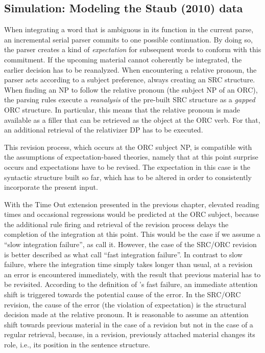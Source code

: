 \documentclass{cambridge7A}\usepackage[]{graphicx}\usepackage[]{color}
\begin{document}
\subsection{Simulation: Modeling the Staub (2010) data}
When integrating a word that is ambiguous in its function in the current parse, an incremental serial parser commits to one possible continuation. By doing so, the parser creates a kind of \emph{expectation} for subsequent words to conform with this commitment. If the upcoming material cannot coherently be integrated, the earlier decision has to be reanalyzed.
When encountering a relative pronoun, the \cite{LewisVasishth2005} parser acts according to a subject preference, always creating an SRC structure.
When finding an NP to follow the relative pronoun (the subject NP of an ORC), the parsing rules execute a \emph{reanalysis} of the pre-built SRC structure as a \emph{gapped} ORC structure. In particular, this means that the relative pronoun is made available as a filler that can be retrieved as the object at the ORC verb. For that, an additional retrieval of the relativizer DP has to be executed. 

This revision process, which occurs at the ORC subject NP, is compatible with the assumptions of expectation-based theories, namely that at this point surprise occurs and expectations have to be revised. The expectation in this case is the syntactic structure built so far, which has to be altered in order to consistently incorporate the present input.

With the Time Out extension presented in the previous chapter, elevated reading times and occasional regressions would be predicted at the ORC subject, because the additional rule firing and retrieval of the revision process delays the completion of the integration at this point. This would be the case if we assume a ``slow integration failure'', as \cite{ReichleWarrenMcConnell2009} call it. However, the case of the SRC/ORC revision is better described as what \cite{ReichleWarrenMcConnell2009} call ``fast integration failure''. In contrast to slow failure, where  the integration time simply takes longer than usual, at a revision an error is encountered immediately, with the result that previous material has to be revisited. 
According to the definition of \cite{ReichleWarrenMcConnell2009}'s fast failure, an immediate attention shift is triggered towards the potential cause of the error. In the SRC/ORC revision, the cause of the error (the violation of expectation) is the structural decision made at the relative pronoun.
It is reasonable to assume an attention shift towards previous material in the case of a revision but not in the case of a regular retrieval, because, in a revision, previously attached material changes its role, i.e., its position in the sentence structure. 
\end{document}
